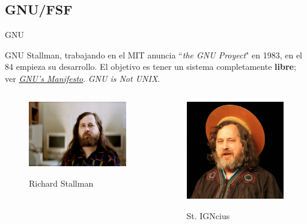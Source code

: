 \documentclass[12pt]{beamer}
\begin{document}
\subsection{GNU/FSF}
\begin{frame}{GNU}
	\begin{block}{GNU}
		Stallman, trabajando en el MIT anuncia ``\textit{the GNU Proyect}" en 1983, en el 84 empieza su desarrollo. El objetivo es tener un sistema completamente \textbf{libre}; ver \href{https://www.gnu.org/gnu/manifesto.html}{\textit{GNU's Manifesto}}. \textit{GNU is Not UNIX}. 
	\end{block}
	\begin{columns}
		\begin{column}{0.5\textwidth}
			\begin{figure}
				\centering
				\href{https://www.stallman.org/}{\includegraphics[width=\linewidth]{anopensourcelabel}}
				\caption{Richard Stallman}
				\label{fig:anopensourcelabel}
			\end{figure}
		\end{column}
		\begin{column}{0.5\textwidth}
			\begin{figure}
				\centering
				\href{https://www.youtube.com/watch?v=1jPmnDZ6ab8}{\includegraphics[width=0.7\linewidth]{FlICmGnj}}
				\caption{St. IGNcius}
				\label{fig:flicmgnj}
			\end{figure}
		

\end{column}
\end{columns}
\end{frame}
\end{document}

